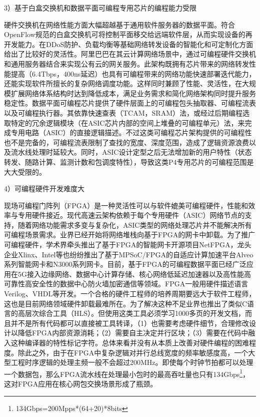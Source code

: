 3）基于白盒交换机和数据平面可编程专用芯片的编程能力受限

硬件交换机在网络性能方面大幅超越基于通用软件服务器的数据平面。符合OpenFlow规范的白盒交换机可将控制平面移交给远端软件层，从而实现设备的再开发能力。在DDoS防护、负载均衡等基础网络转发设备的智能化和可定制化方面给出了比较好的灵活性。阿里巴巴在其云计算网络场景中，通过可编程硬件交换机和通用服务器结合来实现公有云的网关服务。此架构既拥有芯片带来的网络转发性能提高（6.4Tbps，400ns延迟）也具有可编程带来的网络功能快速部署迭代能力，还能实现软件所擅长的复杂网络调度功能。这样同时兼顾了性能、灵活性，在大规模扩展网络体系结构时达到降低成本，满足业务需求和简化网络架构同时提升服务稳定性。数据平面可编程芯片提供了硬件层面上的可编程包头抽取器、可编程流表以及可编程执行器。其依靠快速查表（TCAM，SRAM）法，或经过后期编程选取特定的冗余逻辑模块（在ASIC芯片内部的空间上堆叠的可编程单元）法，来完成专用电路（ASIC）的直接逻辑描述。不过这类可编程芯片架构提供的可编程性也不是完备的，可编程流表限制了查找的宽度、深度范围，造成了逻辑资源浪费以及流水线处理时延较大。同时，ASIC设计定型之后无法增加新的用户特性（状态转发、随路计算、监测计数和包调度特性），导致这类P4专用芯片的可编程范围是大大受限的。

4）可编程硬件开发难度大

现场可编程门阵列（FPGA）是一种灵活性可以与软件媲美可编程硬件，性能和效率与专用硬件接近。现代高速云架构依赖于每个专用硬件（ASIC）网络节点的支持，随着网络功能需求多变与复杂化，ASIC类型的网络处理芯片并不能解决所有可编程场景需求。业界已经开始将网络堆栈向基于FPGA的网卡中卸载。为了推广可编程硬件，学术界牵头推出了基于FPGA的智能网卡开源项目NetFPGA，龙头企业Xlinx、Intel等也纷纷推出了基于MPSoC/FPGA的自适应计算加速平台Alveo系列智能网卡和N3000系列网卡。目前，基于FPGA的可编程数据平面已经广泛应用在5G接入边缘网络、数据中心计算存储、核心网络低延迟加速器以及高性能高可靠性高安全性的数据中心防火墙加密通信等领域。FPGA一般用硬件描述语言Verilog、VHDL等开发。一个合格的硬件工程师的培养周期要远大于软件工程师，这也是目前网络领域硬件卸载最难所在。为了解决这种不足业界也推出了类似C语言的高层次综合工具（HLS）。但使用这类工具必须学习1000多页的开发文档，而且并不是所有代码都可以直接被工具转译，（1）也需要考虑硬件细节，合理修改设计以降低FPGA内部资源消耗；（2）需要自主决定并行区块；（3）需要在代码中融入这种编译器的特性标记字符。总体来看并没有从本质上改善对硬件编程的困难程度。除此之外，由于在FPGA中复杂逻辑对并行总线宽度的频率敏感度高，一个大型工程时序逻辑的处理主频一般不会超过200MHz。即使每个时钟节拍都可以处理一个数据包，那么FPGA流水线在处理最小包时的最高吞吐量也只有134Gbps\footnote{134Gbps=200Mpps*(64+20)*8bits}，这对FPGA应用在核心网包交换场景形成了瓶颈。




